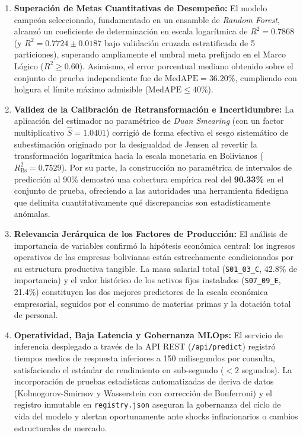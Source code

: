 \begin{enumerate}
    \item \textbf{Superación de Metas Cuantitativas de Desempeño:}
    El modelo campeón seleccionado, fundamentado en un ensamble de \textit{Random Forest}, alcanzó un coeficiente de determinación en escala logarítmica de \textbf{$R^2 = 0.7868$} (y $R^2 = 0.7724 \pm 0.0187$ bajo validación cruzada estratificada de 5 particiones), superando ampliamente el umbral meta prefijado en el Marco Lógico ($R^2 \ge 0.60$). Asimismo, el error porcentual mediano obtenido sobre el conjunto de prueba independiente fue de \textbf{$\text{MedAPE} = 36.20\%$}, cumpliendo con holgura el límite máximo admisible ($\text{MedAPE} \le 40\%$).

    \item \textbf{Validez de la Calibración de Retransformación e Incertidumbre:}
    La aplicación del estimador no paramétrico de \textit{Duan Smearing} (con un factor multiplicativo $\hat{S} = 1.0401$) corrigió de forma efectiva el sesgo sistemático de subestimación originado por la desigualdad de Jensen al revertir la transformación logarítmica hacia la escala monetaria en Bolivianos ($R^2_{\text{Bs}} = 0.7529$). Por su parte, la construcción no paramétrica de intervalos de predicción al 90\% demostró una cobertura empírica real del \textbf{90.33\%} en el conjunto de prueba, ofreciendo a las autoridades una herramienta fidedigna que delimita cuantitativamente qué discrepancias son estadísticamente anómalas.

    \item \textbf{Relevancia Jerárquica de los Factores de Producción:}
    El análisis de importancia de variables confirmó la hipótesis económica central: los ingresos operativos de las empresas bolivianas están estrechamente condicionados por su estructura productiva tangible. La masa salarial total (\texttt{S01\_03\_C}, 42.8\% de importancia) y el valor histórico de los activos fijos instalados (\texttt{S07\_09\_E}, 21.4\%) constituyen los dos mejores predictores de la escala económica empresarial, seguidos por el consumo de materias primas y la dotación total de personal.

    \item \textbf{Operatividad, Baja Latencia y Gobernanza MLOps:}
    El servicio de inferencia desplegado a través de la API REST (\texttt{/api/predict}) registró tiempos medios de respuesta inferiores a 150 milisegundos por consulta, satisfaciendo el estándar de rendimiento en sub-segundo ($< 2$ segundos). La incorporación de pruebas estadísticas automatizadas de deriva de datos (Kolmogorov-Smirnov y Wasserstein con corrección de Bonferroni) y el registro inmutable en \texttt{registry.json} aseguran la gobernanza del ciclo de vida del modelo y alertan oportunamente ante shocks inflacionarios o cambios estructurales de mercado.
\end{enumerate}

